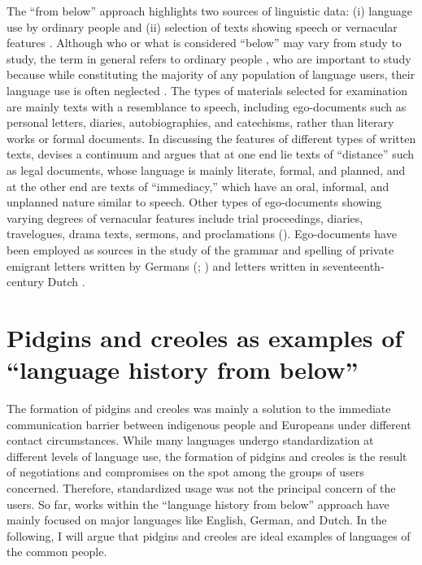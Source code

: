 \documentclass[english,output=paper,colorlinks,citecolor=brown]{../langscibook}
\begin{document}
 The “from below” approach highlights two sources of linguistic data: (i) language use by ordinary people and (ii) selection of texts showing speech or vernacular features \citep{Elspaß2007}. Although who or what is considered “below” may vary from study to study, the term in general refers to ordinary people \citep{Hailwood2013}, who are important to study because while constituting the majority of any population of language users, their language use is often neglected \citep{Elspaß2007}. The types of materials selected for examination are mainly texts with a resemblance to speech, including ego-documents such as personal letters, diaries, autobiographies, and catechisms, rather than literary works or formal documents. In discussing the features of different types of written texts, \citet{Elspaß2012} devises a continuum and argues that at one end lie texts of “distance” such as legal documents, whose language is mainly literate, formal, and planned, and at the other end are texts of “immediacy,” which have an oral, informal, and unplanned nature similar to speech. Other types of ego-documents showing varying degrees of vernacular features include trial proceedings, diaries, travelogues, drama texts, sermons, and proclamations (\citealt{Van-der-WalRutten2013}). Ego-documents have been employed as sources in the study of the grammar and spelling of private emigrant letters written by Germans (\citealt{Elspaß2007}; \citealt{ElspaßEtAl2007}) and letters written in seventeenth-century Dutch \citep{Nobels2013}.

\section{Pidgins and creoles as examples of “language history from below”}\label{sec:7:3}

The formation of pidgins and creoles was mainly a solution to the immediate communication barrier between indigenous people and Europeans under different contact circumstances. While many languages undergo standardization at different levels of language use, the formation of pidgins and creoles is the result of negotiations and compromises on the spot among the groups of users concerned. Therefore, standardized usage was not the principal concern of the users. So far, works within the “language history from below” approach have mainly focused on major languages like English, German, and Dutch. In the following, I will argue that pidgins and creoles are ideal examples of languages of the common people. 
\end{document}
